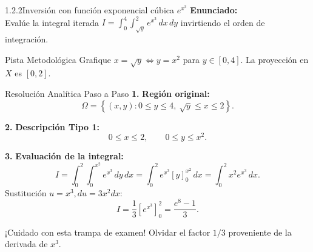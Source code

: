 \documentclass[11pt,a4paper]{article}
\begin{document}
\begin{nivelbox}{1.2.2}{Inversión con función exponencial cúbica $e^{x^3}$}
\textbf{Enunciado:}\\
Evalúe la integral iterada $I = \int_0^4 \int_{\sqrt{y}}^2 e^{x^3} \, dx \, dy$ invirtiendo el orden de integración.

\begin{observacionbox}{Pista Metodológica}
Grafique $x = \sqrt{y} \iff y = x^2$ para $y \in [0, 4]$. La proyección en $X$ es $[0, 2]$.
\end{observacionbox}

\begin{ejerciciobox}{Resolución Analítica Paso a Paso}
\smallskip\noindent\textbf{1.} \textbf{Región original:}
\[\Omega = \left\{ (x,y) : 0 \le y \le 4, \ \sqrt{y} \le x \le 2 \right\}.\]

\smallskip\noindent\textbf{2.} \textbf{Descripción Tipo 1:}
\[0 \le x \le 2, \qquad 0 \le y \le x^2.\]

\smallskip\noindent\textbf{3.} \textbf{Evaluación de la integral:}
\[I = \int_0^2 \int_0^{x^2} e^{x^3} \, dy \, dx = \int_0^2 e^{x^3} [y]_0^{x^2} \, dx = \int_0^2 x^2 e^{x^3} \, dx.\]
Sustitución $u = x^3, du = 3x^2 dx$:
\[I = \frac{1}{3} \left[ e^{x^3} \right]_0^2 = \frac{e^8 - 1}{3}.\]
\end{ejerciciobox}

\begin{errorbox}{¡Cuidado con esta trampa de examen!}
Olvidar el factor $1/3$ proveniente de la derivada de $x^3$.
\end{errorbox}
\end{nivelbox}
\bigskip
\end{document}
